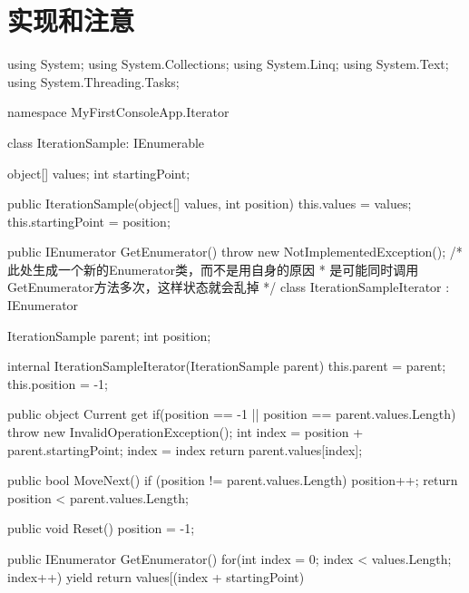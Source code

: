 \section{实现和注意}
\begin{CSharp}[C\#1中的实现]
using System;
using System.Collections;
using System.Linq;
using System.Text;
using System.Threading.Tasks;

namespace MyFirstConsoleApp.Iterator
{
    class IterationSample: IEnumerable
    {
        object[] values;
        int startingPoint;

        public IterationSample(object[] values, int position)
        {
            this.values = values;
            this.startingPoint = position;
        }

        public IEnumerator GetEnumerator()
        {
            throw new NotImplementedException();
        }
        /* 此处生成一个新的Enumerator类，而不是用自身的原因
         * 是可能同时调用GetEnumerator方法多次，这样状态就会乱掉
         */
        class IterationSampleIterator : IEnumerator
        {
            IterationSample parent;
            int position;

            internal IterationSampleIterator(IterationSample parent)
            {
                this.parent = parent;
                this.position = -1;
            }

            public object Current
            {
                get { 
                    if(position == -1 || position == parent.values.Length)
                    {
                        throw new InvalidOperationException();
                    }
                    int index = position + parent.startingPoint;
                    index = index %
                    return parent.values[index];
                }
            }

            public bool MoveNext()
            {
                if (position != parent.values.Length)
                {
                    position++;
                }
                return position < parent.values.Length;
            }

            public void Reset()
            {
                position = -1;
            }
        }
    }


}
\end{CSharp}
\begin{CSharp}[C\#2中的实现]
        public IEnumerator GetEnumerator()
        {
           for(int index = 0; index < values.Length; index++)
           {
               yield return values[(index + startingPoint) %
           }
        }
\end{CSharp}

